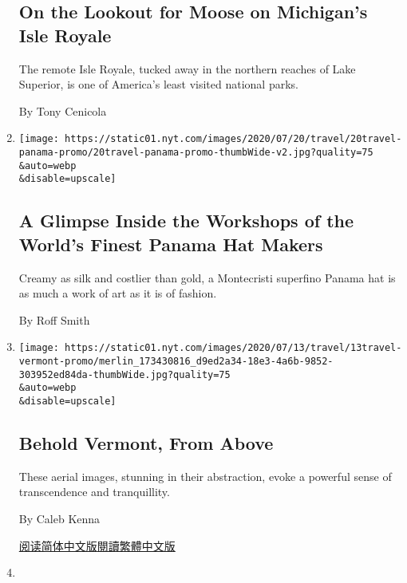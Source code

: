 \begin{enumerate}
  \hypertarget{on-the-lookout-for-moose-on-michigans-isle-royale}{%
  \subsection{On the Lookout for Moose on Michigan's Isle
  Royale}\label{on-the-lookout-for-moose-on-michigans-isle-royale}}

  The remote Isle Royale, tucked away in the northern reaches of Lake
  Superior, is one of America's least visited national parks.

  By Tony Cenicola
\item
  \href{/2020/07/20/travel/panama-hats-ecuador.html}{}

  \texttt{[image: https://static01.nyt.com/images/2020/07/20/travel/20travel-panama-promo/20travel-panama-promo-thumbWide-v2.jpg?quality=75\\\&auto=webp\\\&disable=upscale]}

  \hypertarget{a-glimpse-inside-the-workshops-of-the-worlds-finest-panama-hat-makers}{%
  \subsection{A Glimpse Inside the Workshops of the World's Finest
  Panama Hat
  Makers}\label{a-glimpse-inside-the-workshops-of-the-worlds-finest-panama-hat-makers}}

  Creamy as silk and costlier than gold, a Montecristi superfino Panama
  hat is as much a work of art as it is of fashion.

  By Roff Smith
\item
  \href{/2020/07/13/travel/vermont-drone-photographs.html}{}

  \texttt{[image: https://static01.nyt.com/images/2020/07/13/travel/13travel-vermont-promo/merlin\_173430816\_d9ed2a34-18e3-4a6b-9852-303952ed84da-thumbWide.jpg?quality=75\\\&auto=webp\\\&disable=upscale]}

  \hypertarget{behold-vermont-from-above}{%
  \subsection{Behold Vermont, From
  Above}\label{behold-vermont-from-above}}

  These aerial images, stunning in their abstraction, evoke a powerful
  sense of transcendence and tranquillity.

  By Caleb Kenna

  \href{https://cn.nytimes.com/travel/20200721/vermont-drone-photographs/}{阅读简体中文版}\href{https://cn.nytimes.com/travel/20200721/vermont-drone-photographs/zh-hant/}{閱讀繁體中文版}
\item
  \href{/2020/07/06/travel/tshiuetin-railroad-canada.html}{}


\end{enumerate}
